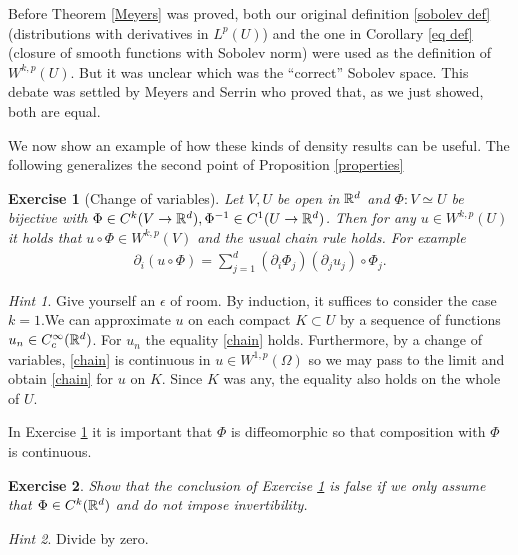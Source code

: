 \documentclass[12pt]{article}
\newtheorem{exercise}{Exercise}
\theoremstyle{remark}
\newtheorem*{hint}{Hint}
\begin{document}
Before  Theorem \ref{Meyers} was proved, both our original definition  \ref{sobolev def} (distributions with derivatives in $L^p(U)$) and the one in Corollary \ref{eq def} (closure of smooth functions with Sobolev norm) were used as the definition of $W^{k,p}(U)$. But it was unclear which was the ``correct'' Sobolev space. This debate was settled by Meyers and Serrin who proved that, as we just showed, both are equal.

We now show an example of how these kinds of density results can be useful. The following generalizes the second point of Proposition \ref{properties}
\begin{exercise}[Change of variables]\label{change of variables}
	Let $V,U$ be open in  $\mathbb{R}^d$ and $\Phi: V \simeq U$ be bijective with $ \Phi \in C^k(V \to \mathbb{R}^d), \Phi^{-1} \in C^1(U\to \mathbb{R}^d)$. Then for any $u \in  W^{k,p}(U)$ it holds that $u \circ\Phi \in W^{k,p}(V)$ and the usual chain rule holds. For example
	\begin{align}\label{chain}
		\partial _i (u\circ \Phi) = \sum_{j=1}^d (\partial _i \Phi_j)(\partial _j u_j)\circ \Phi_j  .
	\end{align}
\end{exercise}
\begin{hint}
	Give yourself an $\epsilon $ of room.
	By induction, it suffices to consider the case $k=1$.We can approximate $u$ on each compact  $K \subset U$ by a sequence of functions $u_n \in C_c^\infty(\mathbb{R}^d)$. For $u_n$ the equality \ref{chain} holds. Furthermore, by a change of variables, \eqref{chain} is continuous in $u\in W^{1,p}(\Omega)$ so we may pass to the limit and obtain \eqref{chain} for $u$ on $K$. Since $K$ was any, the equality also holds on the whole of $U$.
\end{hint}
In Exercise \ref{change of variables} it is important that $\Phi$ is diffeomorphic so that composition with $\Phi$ is continuous.
\begin{exercise}
	Show that the conclusion of Exercise \ref{change of variables} is false if we only assume that $\Phi \in C^k(\mathbb{R}^d)$ and do not impose invertibility.
\end{exercise}
\begin{hint}
	Divide by zero.
\end{hint}
\end{document}
